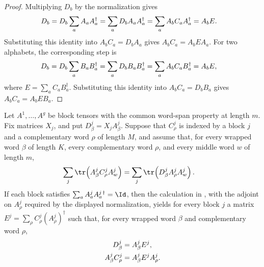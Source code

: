 \begin{proof}
    \leanok
    Multiplying $D_b$ by the normalization gives
    \begin{align}
        D_b
         & =
        D_b\sum_a A_aA_a^\dagger =
        \sum_a D_bA_aA_a^\dagger =
        \sum_a A_bC_aA_a^\dagger =
        A_bE.
        \notag
    \end{align}
    Substituting this identity into $A_bC_a=D_bA_a$ gives
    $A_bC_a=A_bEA_a$. For two alphabets, the corresponding step is
    \begin{align}
        D_b
         & =
        D_b\sum_a B_aB_a^\dagger =
        \sum_a D_bB_aB_a^\dagger =
        \sum_a A_bC_aB_a^\dagger =
        A_bE,
        \notag
    \end{align}
    where $E=\sum_a C_aB_a^\dagger$. Substituting this identity into
    $A_bC_a=D_bB_a$ gives $A_bC_a=A_bEB_a$.
\end{proof}

\begin{lemma}
    \label{lem:pgvwc_cde_identities_from_trace_decompositions}
    \leanok
    Let $A^1,\ldots,A^g$ be block tensors with the common word-span property
    at length $m$. Fix matrices $X_j$, and put
    $D^j_\beta=X_jA^j_\beta$. Suppose that $C^j_\rho$ is indexed by a block
    $j$ and a complementary word $\rho$ of length $M$, and assume that, for
    every wrapped word $\beta$ of length $K$, every complementary word
    $\rho$, and every middle word $w$ of length $m$,
    \begin{align}
        \sum_j\tr\!\left(A^j_\beta C^j_\rho A^j_w\right)
         & =
        \sum_j\tr\!\left(D^j_\beta A^j_\rho A^j_w\right).
        \notag
    \end{align}
    If each block satisfies
    $\sum_a A^j_aA^{j\,\dagger}_a = \Id$,
    then the calculation in
    \cite[Theorem~12, proof lines~1446--1451]{PerezGarcia2007Matrix}, with
    the adjoint on $A^j_\rho$ required by the displayed normalization, yields
    for every block $j$ a matrix
    $E^j = \sum_\rho C^j_\rho\left(A^j_\rho\right)^\dagger$
    such that, for every wrapped word $\beta$ and complementary word $\rho$,
    \begin{align}
        D^j_\beta          & = A^j_\beta E^j,
        \notag                                        \\
        A^j_\beta C^j_\rho & = A^j_\beta E^jA^j_\rho.
        \notag
    \end{align}
\end{lemma}

